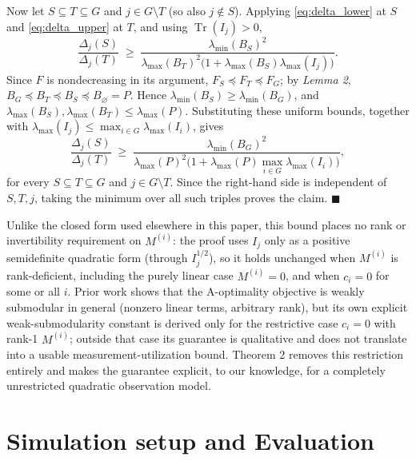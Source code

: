 \documentclass[letterpaper, 10 pt, conference]{ieeeconf}  %
\begin{document}
Now let \(S\subseteq T\subseteq G\) and \(j\in G\setminus T\) (so also $j\notin S$). Applying \eqref{eq:delta_lower} at $S$ and \eqref{eq:delta_upper} at $T$, and using $\operatorname{Tr}(I_j)>0$,
\[
\frac{\Delta_j(S)}{\Delta_j(T)}
\;\ge\;
\frac{\lambda_{\min}(B_S)^2}{\lambda_{\max}(B_T)^2\big(1+\lambda_{\max}(B_S)\lambda_{\max}(I_j)\big)}.
\]
Since $F$ is nondecreasing in its argument, $F_S\preceq F_T\preceq F_G$; by \textit{Lemma 2}, $B_G\preceq B_T\preceq B_S\preceq B_\varnothing=P$. Hence $\lambda_{\min}(B_S)\ge\lambda_{\min}(B_G)$, and $\lambda_{\max}(B_S),\lambda_{\max}(B_T)\le\lambda_{\max}(P)$. Substituting these uniform bounds, together with $\lambda_{\max}(I_j)\le\max_{i\in G}\lambda_{\max}(I_i)$, gives
\[
\frac{\Delta_j(S)}{\Delta_j(T)}
\;\ge\;
\frac{\lambda_{\min}(B_G)^2}{\lambda_{\max}(P)^2\Big(1+\lambda_{\max}(P)\max_{i\in G}\lambda_{\max}(I_i)\Big)},
\]
for every \(S\subseteq T\subseteq G\) and \(j\in G\setminus T\). Since the right-hand side is independent of \(S,T,j\), taking the minimum over all such triples proves the claim. \hfill\(\blacksquare\)

Unlike the closed form used elsewhere in this paper, this bound places no rank or invertibility requirement on $M^{(i)}$: the proof uses $I_j$ only as a positive semidefinite quadratic form (through $I_j^{1/2}$), so it holds unchanged when $M^{(i)}$ is rank-deficient, including the purely linear case $M^{(i)}=0$, and when $c_i=0$ for some or all $i$. Prior work \cite{c19} shows that the A-optimality objective is weakly submodular in general (nonzero linear terms, arbitrary rank), but its own explicit weak-submodularity constant is derived only for the restrictive case $c_i=0$ with rank-1 $M^{(i)}$; outside that case its guarantee is qualitative and does not translate into a usable measurement-utilization bound. Theorem 2 removes this restriction entirely and makes the guarantee explicit, to our knowledge, for a completely unrestricted quadratic observation model.


\section{Simulation setup and Evaluation}
\end{document}
